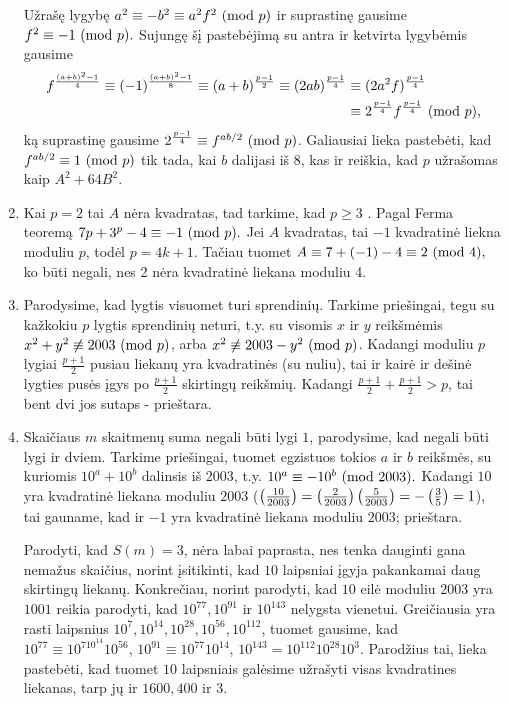 \begin{enumerate}
    Užrašę lygybę $a^2 \equiv -b^2 \equiv a^2f^2 \ (\text{mod } p)$ ir suprastinę
    gausime $f^2\equiv -1 \ (\text{mod } p).$ Sujungę šį pastebėjimą su antra ir
    ketvirta lygybėmis gausime 
    \begin{align*}
    f^\frac{(a+b)^2 - 1}{4}\equiv (-1)^\frac{(a+b)^2 - 1}{8}\equiv
    (a+b)^\frac{p-1}{2} \equiv (2ab)^\frac{p-1}{4} & \equiv
    (2a^2f)^\frac{p-1}{4} \\ &\equiv 2^\frac{p-1}{4} f^\frac{p-1}{4}
    \ (\text{mod } p), 
    \end{align*}
    ką suprastinę gausime $2^\frac{p-1}{4} \equiv f^{ab/2}
    \ (\text{mod } p)$. Galiausiai lieka pastebėti, kad $f^{ab/2} \equiv 1 \ (\text{mod } p)$ tik
    tada, kai $b$ dalijasi iš $8$, kas ir reiškia, kad $p$ užrašomas kaip
    $A^2 + 64B^2.$
\item
    Kai $p=2$ tai $A$ nėra kvadratas, tad tarkime, kad $p\geq 3$ . Pagal
    Ferma teoremą $7p + 3^p - 4\equiv -1 \ (\text{mod } p).$ Jei $A$ kvadratas, tai
    $-1$ kvadratinė liekna moduliu $p$, todėl $p=4k+1$. Tačiau tuomet
    $A \equiv 7+(-1)-4 \equiv 2 \ (\text{mod } 4),$ ko būti negali, nes 2 nėra
    kvadratinė liekana moduliu 4. 
\item
    Parodysime, kad lygtis visuomet turi sprendinių. Tarkime priešingai,
    tegu su kažkokiu $p$ lygtis sprendinių neturi, t.y. su visomis $x$ ir
    $y$ reikšmėmis $x^2 + y^2 \not \equiv 2003 \ (\text{mod } p)$, arba $x^2 \not
    \equiv 2003-y^2 \ (\text{mod } p)$. Kadangi moduliu $p$ lygiai $\frac{p+1}{2}$
    pusiau liekanų yra kvadratinės (su nuliu), tai ir kairė ir dešinė
    lygties pusės įgys po $\frac{p+1}{2}$ skirtingų reikšmių. Kadangi
    $\frac{p+1}{2} + \frac{p+1}{2} > p$, tai bent dvi jos sutaps -
    prieštara.
\item
    Skaičiaus $m$ skaitmenų suma negali būti lygi $1$, parodysime, kad
    negali būti lygi ir dviem. Tarkime priešingai, tuomet egzistuos tokios
    $a$ ir $b$ reikšmės, su kuriomis $10^a + 10^b$ dalinsis iš $2003$, t.y.
    $10^a \equiv -10^b \ (\text{mod } 2003).$ Kadangi $10$ yra kvadratinė liekana
    moduliu $2003$ ($\left(\frac{10}{2003}\right) = \left(\frac{2}{2003}\right)\left(\frac{5}{2003}\right) =
    -\left(\frac{3}{5}\right) = 1$), tai gauname, kad ir $-1$ yra kvadratinė liekana
    moduliu $2003$; prieštara. 
    
    Parodyti, kad $S(m)=3$, nėra labai paprasta, nes tenka
    dauginti gana nemažus skaičius, norint įsitikinti, kad $10$ laipsniai
    įgyja pakankamai daug skirtingų liekanų. Konkrečiau, norint parodyti,
    kad $10$ eilė moduliu $2003$ yra $1001$ reikia parodyti, kad
    $10^{77}, 10^{91}$ ir $10^{143}$ nelygsta vienetui. Greičiausia yra
    rasti laipsnius $10^7, 10^{14}, 10^{28}, 10^{56}, 10^{112}$, tuomet
    gausime, kad $10^{77} \equiv 10^710^{14}10^{56}$, $10^{91} \equiv
    10^{77}10^{14}$, $10^{143} = 10^{112}10^{28}10^3$. 
    Parodžius tai, lieka pastebėti, kad tuomet $10$ laipsniais galėsime
    užrašyti visas kvadratines liekanas, tarp jų ir $1600, 400$ ir
    $3$.
\end{enumerate} 
